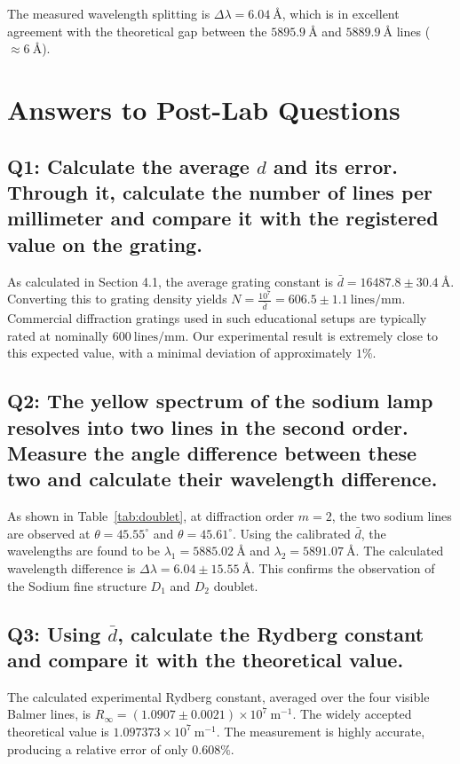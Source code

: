 \documentclass[a4paper,11pt]{article}
\begin{document}
The measured wavelength splitting is $\Delta\lambda = 6.04\ \text{\AA}$, which is in excellent agreement with the theoretical gap between the $5895.9\ \text{\AA}$ and $5889.9\ \text{\AA}$ lines ($\approx 6\ \text{\AA}$).

\section{Answers to Post-Lab Questions}

\subsection*{Q1: Calculate the average $d$ and its error. Through it, calculate the number of lines per millimeter and compare it with the registered value on the grating.}
As calculated in Section 4.1, the average grating constant is $\bar{d} = 16487.8 \pm 30.4\ \text{\AA}$. Converting this to grating density yields $N = \frac{10^7}{\bar{d}} = 606.5 \pm 1.1\ \text{lines/mm}$. Commercial diffraction gratings used in such educational setups are typically rated at nominally $600\ \text{lines/mm}$. Our experimental result is extremely close to this expected value, with a minimal deviation of approximately $1\%$.

\subsection*{Q2: The yellow spectrum of the sodium lamp resolves into two lines in the second order. Measure the angle difference between these two and calculate their wavelength difference.}
As shown in Table~\ref{tab:doublet}, at diffraction order $m=2$, the two sodium lines are observed at $\theta = 45.55^\circ$ and $\theta = 45.61^\circ$. Using the calibrated $\bar{d}$, the wavelengths are found to be $\lambda_1 = 5885.02\ \text{\AA}$ and $\lambda_2 = 5891.07\ \text{\AA}$. The calculated wavelength difference is $\Delta\lambda = 6.04 \pm 15.55\ \text{\AA}$. This confirms the observation of the Sodium fine structure $D_1$ and $D_2$ doublet.

\subsection*{Q3: Using $\bar{d}$, calculate the Rydberg constant and compare it with the theoretical value.}
The calculated experimental Rydberg constant, averaged over the four visible Balmer lines, is $R_\infty = (1.0907 \pm 0.0021) \times 10^7\ \text{m}^{-1}$. The widely accepted theoretical value is $1.097373 \times 10^7\ \text{m}^{-1}$. The measurement is highly accurate, producing a relative error of only $0.608\%$.
\end{document}
